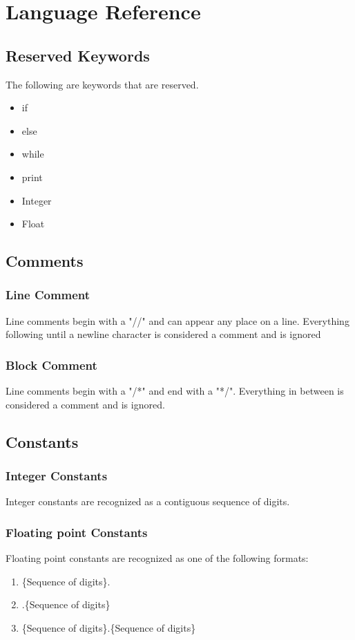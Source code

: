 \documentclass{standalone}
\begin{document}
\setlength{\grammarparsep}{20pt plus 1pt minus 1pt} %
\setlength{\grammarindent}{12em} %

\chapter{Language Reference}

	\section{Reserved Keywords}
		The following are keywords that are reserved.
		\begin{itemize}
			\item if
			\item else
			\item while
			\item print
			\item Integer
			\item Float
		\end{itemize}

	\section{Comments}
		\subsection{Line Comment}
			Line comments begin with a "//" and can appear any place on a line. Everything following  until a newline character is considered a comment and is ignored
		\subsection{Block Comment}
			Line comments begin with a "/*"  and end with a "*/". Everything in between is considered a comment and is ignored.

	\section{Constants}
		\subsection{Integer Constants}
			Integer constants are recognized as a contiguous sequence of digits.
		\subsection{Floating point Constants}
			Floating point constants are recognized as one of the following formats:
			\begin{enumerate}
				\item \{Sequence of digits\}.
				\item .\{Sequence of digits\}
				\item \{Sequence of digits\}.\{Sequence of digits\}
			\end{enumerate}
\end{document}
